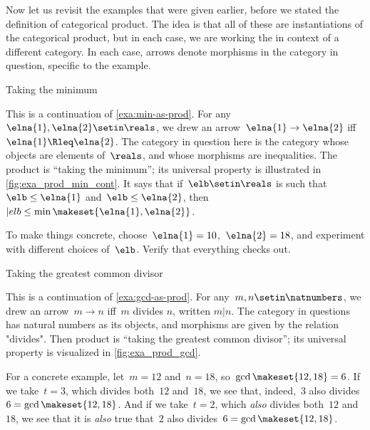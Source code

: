 Now let us revisit the examples that were given earlier, before we stated the definition of categorical product.
The idea is that all of these are instantiations of the categorical product, but in each case, we are working the in context of a different category.
In each case, arrows denote morphisms in the category in question, specific to the example.

\begin{marginfigure}
    \centering
    \caption{Taking the minimum}
    \label{fig:exa_prod_min_cont}
\end{marginfigure}

\begin{example}
    \label{exa:min-as-prod-cont}
    This is a continuation of \cref{exa:min-as-prod}.
    For any~$\elna{1},\elna{2}\setin \reals$, we drew an arrow~$\elna{1}\to \elna{2}$ iff~$\elna{1}\Rleq \elna{2}$.
    The category in question here is the category whose objects are elements of~$\reals$, and whose morphisms are inequalities.
    The product is ``taking the minimum'';
    its universal property is illustrated in \cref{fig:exa_prod_min_cont}.
    It says that if~$\elb \setin \reals$ is such that~$\elb \leq \elna{1}$ and~$\elb \leq \elna{2}$, then~$|elb \leq \min \makeset{ \elna{1}, \elna{2} }$.

    To make things concrete, choose~$\elna{1} = 10$,~$\elna{2} = 18$, and experiment with different choices of~$\elb$.
    Verify that everything checks out.
\end{example}

\begin{marginfigure}
    \centering
    \caption{Taking the greatest common divisor}
    \label{fig:exa_prod_gcd_cont}
\end{marginfigure}

\begin{example}
    \label{exa:gcd-as-prod-cont}
    This is a continuation of \cref{exa:gcd-as-prod}.
    For any~$m, n \setin \natnumbers$, we drew an arrow~$m \to n$ iff~$m$ divides $n$, written $m | n$.
    The category in questions has natural numbers as its objects, and morphisms are given by the relation "divides".
    Then product is ``taking the greatest common divisor''; its universal property is visualized in \cref{fig:exa_prod_gcd}.

    For a concrete example, let~$m = 12$ and~$n = 18$, so~$\gcd \makeset{12, 18 } = 6$.
    If we take~$t = 3$, which divides both~$12$ and~$18$, we see that, indeed,~$3$ also divides~$6 = \gcd \makeset{12, 18 }$.
    And if we take~$t = 2$, which \emph{also} divides both~$12$ and~$18$, we see that it is \emph{also} true that~$2$ also divides~$6 = \gcd \makeset{12, 18 }$.
\end{example}


